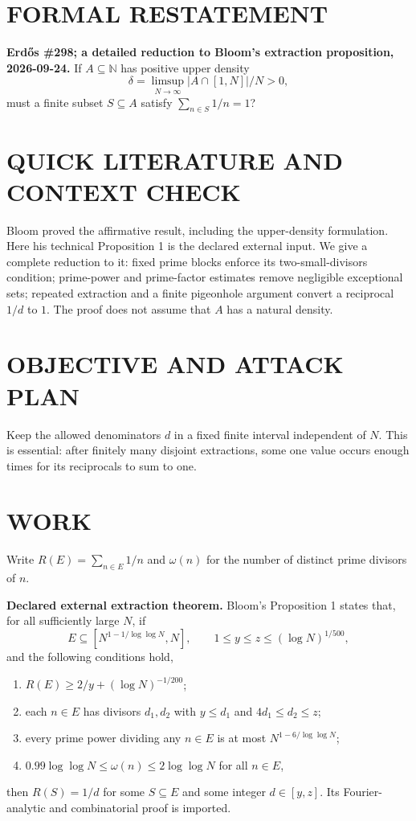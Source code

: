 \section{FORMAL RESTATEMENT}
\textbf{Erd\H{o}s \#298; a detailed reduction to Bloom's extraction proposition, 2026-09-24.}
If $A\subseteq\mathbb N$ has positive upper density
\[
\delta=\limsup_{N\to\infty}|A\cap[1,N]|/N>0,
\]
must a finite subset $S\subseteq A$ satisfy $\sum_{n\in S}1/n=1$?

\section{QUICK LITERATURE AND CONTEXT CHECK}
Bloom proved the affirmative result, including the upper-density formulation. Here his technical Proposition 1 is the declared external input. We give a complete reduction to it: fixed prime blocks enforce its two-small-divisors condition; prime-power and prime-factor estimates remove negligible exceptional sets; repeated extraction and a finite pigeonhole argument convert a reciprocal $1/d$ to $1$. The proof does not assume that $A$ has a natural density.

\section{OBJECTIVE AND ATTACK PLAN}
Keep the allowed denominators $d$ in a fixed finite interval independent of $N$. This is essential: after finitely many disjoint extractions, some one value occurs enough times for its reciprocals to sum to one.

\section{WORK}
Write $R(E)=\sum_{n\in E}1/n$ and $\omega(n)$ for the number of distinct prime divisors of $n$.

\textbf{Declared external extraction theorem.} Bloom's Proposition 1 states that, for all sufficiently large $N$, if
\[
E\subseteq[N^{1-1/\log\log N},N],\qquad
1\leq y\leq z\leq(\log N)^{1/500},
\]
and the following conditions hold,
\begin{enumerate}
\item $R(E)\geq2/y+(\log N)^{-1/200}$;
\item each $n\in E$ has divisors $d_1,d_2$ with $y\leq d_1$ and $4d_1\leq d_2\leq z$;
\item every prime power dividing any $n\in E$ is at most $N^{1-6/\log\log N}$;
\item $0.99\log\log N\leq\omega(n)\leq2\log\log N$ for all $n\in E$,
\end{enumerate}
then $R(S)=1/d$ for some $S\subseteq E$ and some integer $d\in[y,z]$. Its Fourier-analytic and combinatorial proof is imported.

